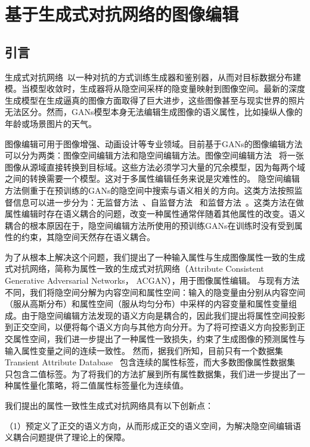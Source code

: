 \chapter{基于生成式对抗网络的图像编辑}

\section{引言}

生成式对抗网络~\cite{GANs}以一种对抗的方式训练生成器和鉴别器，从而对目标数据分布建模。当模型收敛时，生成器将从隐空间采样的隐变量映射到图像空间。最新的深度生成模型在生成逼真的图像方面取得了巨大进步，这些图像甚至与现实世界的照片无法区分。然而，GANs模型本身无法编辑生成图像的语义属性，比如操纵人像的年龄或场景图片的天气。

图像编辑可用于图像增强、动画设计等专业领域。目前基于GANs的图像编辑方法可以分为两类：图像空间编辑方法和隐空间编辑方法。图像空间编辑方法~\cite{cyclegan,i2i0,i2i1,i2i2} 将一张图像从源域直接转换到目标域。这些方法必须学习大量的冗余模型，因为每两个域之间的转换需要一个模型。这对于多属性编辑任务来说是灾难性的。
隐空间编辑方法侧重于在预训练的GANs的隐空间中搜索与语义相关的方向。这类方法按照监督信息可以进一步分为：无监督方法~\cite{icml2020,harkonen2020ganspace}、自监督方法~\cite{steer,variation} 和监督方法~\cite{interfacegan,iclr2021}。这类方法在做属性编辑时存在语义耦合的问题，改变一种属性通常伴随着其他属性的改变。语义耦合的根本原因在于，隐空间编辑方法所使用的预训练GANs在训练时没有受到属性的约束，其隐空间天然存在语义耦合。

为了从根本上解决这个问题，我们提出了一种输入属性与生成图像属性一致的生成式对抗网络，简称为属性一致的生成式对抗网络（Attribute Consistent Generative Adversarial Networks， ACGAN），用于图像属性编辑。
与现有方法不同，我们将隐空间分解为内容空间和属性空间：输入的隐变量由分别从内容空间（服从高斯分布）和属性空间（服从均匀分布）中采样的内容变量和属性变量组成。由于隐空间编辑方法发现的语义方向是耦合的，因此我们提出将属性空间投影到正交空间，以便将每个语义方向与其他方向分开。为了将可控语义方向投影到正交属性空间，我们进一步提出了一种属性一致损失，约束了生成图像的预测属性与输入属性变量之间的连续一致性。
然而，据我们所知，目前只有一个数据集Transient Attribute Database~\cite{scenedataset} 包含连续的属性标签，而大多数图像属性数据集~\cite{celeba,place,sun} 只包含二值标签。为了将我们的方法扩展到所有属性数据集，我们进一步提出了一种属性量化策略，将二值属性标签量化为连续值。

我们提出的属性一致性生成式对抗网络具有以下创新点：

（1）预定义了正交的语义方向，从而形成正交的语义空间，为解决隐空间编辑语义耦合问题提供了理论上的保障。

